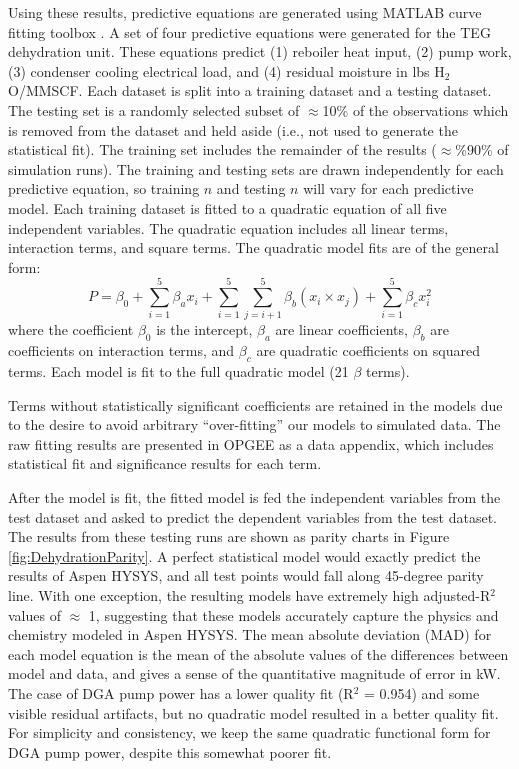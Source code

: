 \documentclass[11pt]{report}
\begin{document}
Using these results, predictive equations are generated using MATLAB curve fitting toolbox \cite{Mathworks2016}.  A set of four predictive equations were generated for the TEG dehydration unit. These equations predict (1) reboiler heat input, (2) pump work, (3) condenser cooling electrical load, and (4) residual moisture in lbs H$_2$O/MMSCF. Each dataset is split into a training dataset and a testing dataset. The testing set is a randomly selected subset of $\approx$10\% of the observations which is removed from the dataset and held aside (i.e., not used to generate the statistical fit). The training set includes the remainder of the results ($\approx$\%90\% of simulation runs). The training and testing sets are drawn independently for each predictive equation, so training $n$ and testing $n$ will vary for each predictive model. Each training dataset is fitted to a quadratic equation of all five independent variables. The quadratic equation includes all linear terms, interaction terms, and square terms. The quadratic model fits are of the general form:
\begin{equation}
P 	= \beta_0 + \sum_{i=1}^{5} \beta_a x_i + \sum_{i=1}^{5} \sum_{j=i+1}^{5} \beta_b \left(x_i \times x_j\right) + \sum_{i=1}^{5} \beta_c x_i^2
\end{equation}
where the coefficient $\beta_0$ is the intercept, $\beta_a$ are linear coefficients, $\beta_b$ are coefficients on interaction terms, and $\beta_c$ are quadratic coefficients on squared terms.  Each model is fit to the full quadratic model (21 $\beta$ terms). 

Terms without statistically significant coefficients are retained in the models due to the desire to avoid arbitrary ``over-fitting'' our models to simulated data. The raw fitting results are presented in OPGEE as a data appendix, which includes statistical fit and significance results for each term.

After the model is fit, the fitted model is fed the independent variables from the test dataset and asked to predict the dependent variables from the test dataset. The results from these testing runs are shown as parity charts in Figure \ref{fig:DehydrationParity}. A perfect statistical model would exactly predict the results of Aspen HYSYS, and all test points would fall along 45-degree parity line. With one exception, the resulting models have extremely high adjusted-R$^2$ values of $\approx$ 1, suggesting that these models accurately capture the physics and chemistry modeled in Aspen HYSYS. The mean absolute deviation (MAD) for each model equation is the mean of the absolute values of the differences between model and data, and gives a sense of the quantitative magnitude of error in kW. The case of DGA pump power has a lower quality fit (R$^2$ = 0.954) and some visible residual artifacts, but no quadratic model resulted in a better quality fit. For simplicity and consistency, we keep the same quadratic functional form for DGA pump power, despite this somewhat poorer fit.
\end{document}

